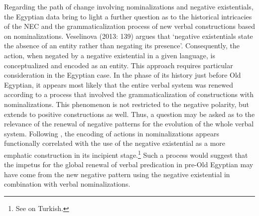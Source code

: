 \documentclass[output=paper]{langsci/langscibook}
\begin{document}
Regarding the path of change involving nominalizations and negative existentials, the Egyptian data bring to light a further question as to the historical intricacies of the NEC and the grammaticalization process of new verbal constructions based on nominalizations. Veselinova (2013: 139) argues that ‘negative existentials state the absence of an entity rather than negating its presence’. Consequently, the action, when negated by a negative existential in a given language, is conceptualized and encoded as an entity. This approach requires particular consideration in the Egyptian case. In the phase of its history just before Old Egyptian, it appears most likely that the entire verbal system was renewed according to a process that involved the grammaticalization of constructions with nominalizations. This phenomenon is not restricted to the negative polarity, but extends to positive constructions as well. Thus, a question may be asked as to the relevance of the renewal of negative patterns for the evolution of the whole verbal system. Following \citet{Veselinova2016}, the encoding of actions in nominalizations appears functionally correlated with the use of the negative existential as a more emphatic construction in its incipient stage.\footnote{See \citet[160]{Veselinova2016} on Turkish.} 
Such a process would suggest that the impetus for the global renewal of verbal predication in pre-Old Egyptian may have come from the new negative pattern using the negative existential in combination with verbal nominalizations. 
 
\end{document}
